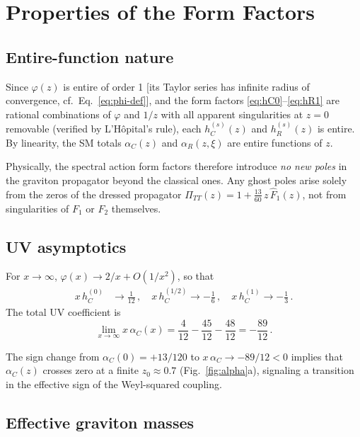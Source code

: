 \documentclass[aps,prd,twocolumn,superscriptaddress,nofootinbib,floatfix]{revtex4-2}
\begin{document}
\section{Properties of the Form Factors}
\label{sec:properties}

\subsection{Entire-function nature}

Since $\varphi(z)$ is entire of order 1 [its Taylor series has infinite radius
of convergence, cf.\ Eq.~\eqref{eq:phi-def}], and the form factors
\eqref{eq:hC0}--\eqref{eq:hR1} are rational combinations of $\varphi$ and
$1/z$ with all apparent singularities at $z = 0$ removable (verified by
L'H\^opital's rule), each $h_C^{(s)}(z)$ and $h_R^{(s)}(z)$ is entire. By
linearity, the SM totals $\alpha_C(z)$ and $\alpha_R(z,\xi)$ are entire
functions of $z$.

Physically, the spectral action form factors therefore introduce \emph{no new
poles} in the graviton propagator beyond the classical ones. Any ghost poles arise solely from the zeros of the dressed propagator
$\Pi_{TT}(z) = 1 + \frac{13}{60}\,z\,\hat{F}_1(z)$, not from singularities of
$F_1$ or $F_2$ themselves.

\subsection{UV asymptotics}

For $x \to \infty$, $\varphi(x) \to 2/x + O(1/x^2)$, so that
\begin{align}
  x\,h_C^{(0)} &\to \frac{1}{12}\,,\quad
  x\,h_C^{(1/2)} \to -\frac{1}{6}\,,\quad
  x\,h_C^{(1)} \to -\frac{1}{3}\,.
\end{align}
The total UV coefficient is
\begin{equation}
  \lim_{x\to\infty} x\,\alpha_C(x)
    = \frac{4}{12} - \frac{45}{12} - \frac{48}{12}
    = -\frac{89}{12}\,.
  \label{eq:uv-coeff}
\end{equation}

The sign change from $\alpha_C(0) = +13/120$ to
$x\,\alpha_C \to -89/12 < 0$ implies that $\alpha_C(z)$ crosses zero at a
finite $z_0 \approx 0.7$ (Fig.~\ref{fig:alpha}a), signaling a transition
in the effective sign of the Weyl-squared coupling.

\subsection{Effective graviton masses}
\label{sec:masses}
\end{document}
